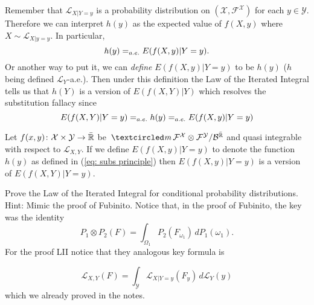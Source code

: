 

Remember that $\mathcal L_{X|Y=y}$ is a probability distribution on $(\mathcal X,\mathcal F^{\mathcal X})$ for each $y\in \mathcal Y$. Therefore we can interpret $h(y)$ as the expected value of $f(X,y)$ where $X\sim \mathcal L_{X|y=y}$. In particular,
\[
h(y)=_{\tiny a.e.} E(f(X,y)|Y=y).
\]
Or another way to put it, we can {\em define} $E(f(X,y)|Y=y)$ to be $h(y)$ ($h$ being defined $\mathcal L_Y$-a.e.). Then under this definition the Law of the Iterated Integral tells us that  $h(Y)$ is a version of $E(f(X,Y)|Y)$ which resolves the substitution fallacy since
\[
E(f(X,Y)|Y=y) =_{\tiny a.e.} h(y) =_{\tiny a.e.} E(f(X,y)|Y=y)
\]

\begin{corollary}
Let $f(x,y)\colon \mathcal X\times \mathcal Y\rightarrow \bar{\Bbb R}$ be $\mcirc \mathcal F^{\mathcal X}\otimes \mathcal F^{\mathcal Y}/\mathcal B^{\bar{\Bbb R}}$ and quasi integrable with respect to $\mathcal L_{X,Y}$.  If we define $E(f(X,y) |Y=y)$ to denote the function $h(y)$ as defined in (\ref{eq: subs principle}) then $E(f(X,y)|Y=y)$ is a version of $E(f(X,Y) |Y=y)$.
\end{corollary}




\begin{exercise} Prove the Law of the Iterated Integral for conditional probability distributions. Hint: Mimic the proof of Fubinito. Notice that, in the proof of Fubinito,  the key was the identity
\[P_1\otimes P_2(F) = \int_{\Omega_1} P_2(F_{\omega_1}) \, dP_1(\omega_1).   \]
For the proof LII notice that they analogous key formula is

\[\mathcal L_{X,Y}(F) = \int_{\mathcal Y} \mathcal L_{X|Y=y}(F_y) \,d\mathcal L_Y(y) \]
which we already proved in the notes.
\end{exercise}


